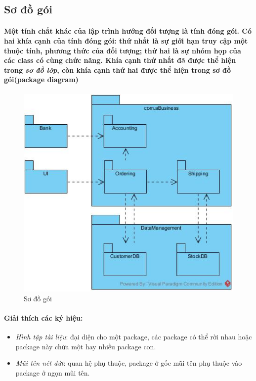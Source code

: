 \documentclass{article}
\begin{document}
  \subsection{Sơ đồ gói}

  \paragraph{\textnormal{
    Một tính chất khác của lập trình hướng đối tượng là tính đóng gói. Có hai khía cạnh của tính đóng gói: thứ nhất là sự giới hạn truy cập một thuộc tính, phương thức của đối tượng; thứ hai là sự nhóm họp của các class có cùng chức năng. Khía cạnh thứ nhất đã được thể hiện trong \textit{sơ đồ lớp}, còn khía cạnh thứ hai được thể hiện trong sơ đồ gói(package diagram)
  }}

  \begin{figure}[!ht]
    \centering
    \includegraphics[scale=0.5]{../pictures/diagrams/package/package-diagram-1.jpg}
    \caption{Sơ đồ gói}
  \end{figure}

  \paragraph{\textnormal{
    Giải thích các ký hiệu:
  }}

  \begin{itemize}
    \item \textit{Hình tập tài liệu}: đại diện cho một package, các package có thể rời nhau hoặc package này chứa một hay nhiều package con.
    \item \textit{Mũi tên nét đứt}: quan hệ phụ thuộc, package ở gốc mũi tên phụ thuộc vào package ở ngọn mũi tên.
  \end{itemize}
\end{document}
